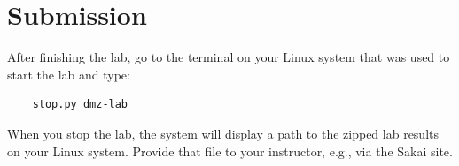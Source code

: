 \section{Submission}
After finishing the lab, go to the terminal on your Linux system that was used to start the lab and type:
\begin{verbatim}
    stop.py dmz-lab
\end{verbatim}
When you stop the lab, the system will display a path to the zipped lab results on your Linux system.  Provide that file to 
your instructor, e.g., via the Sakai site.


